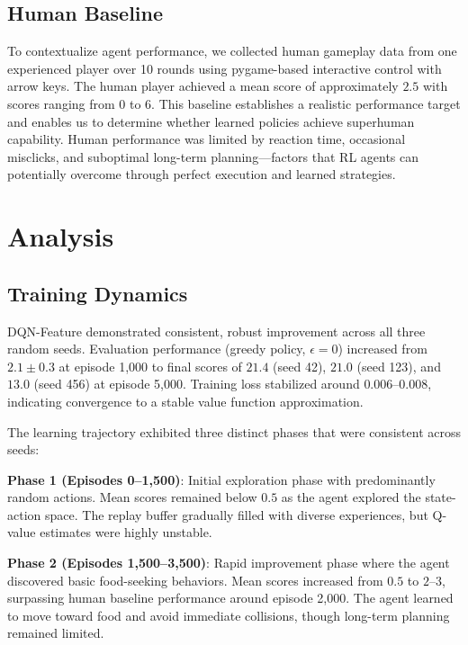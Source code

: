 \documentclass[10pt,a4paper,twocolumn]{article}
\begin{document}
\subsection{Human Baseline}

To contextualize agent performance, we collected human gameplay data from one experienced player over 10 rounds using pygame-based interactive control with arrow keys. The human player achieved a mean score of approximately $2.5$ with scores ranging from 0 to 6. This baseline establishes a realistic performance target and enables us to determine whether learned policies achieve superhuman capability. Human performance was limited by reaction time, occasional misclicks, and suboptimal long-term planning---factors that RL agents can potentially overcome through perfect execution and learned strategies.

\section{Analysis}

\subsection{Training Dynamics}

DQN-Feature demonstrated consistent, robust improvement across all three random seeds. Evaluation performance (greedy policy, $\epsilon = 0$) increased from $2.1 \pm 0.3$ at episode 1,000 to final scores of $21.4$ (seed 42), $21.0$ (seed 123), and $13.0$ (seed 456) at episode 5,000. Training loss stabilized around $0.006$--$0.008$, indicating convergence to a stable value function approximation.

The learning trajectory exhibited three distinct phases that were consistent across seeds:

\textbf{Phase 1 (Episodes 0--1,500)}: Initial exploration phase with predominantly random actions. Mean scores remained below $0.5$ as the agent explored the state-action space. The replay buffer gradually filled with diverse experiences, but Q-value estimates were highly unstable.

\textbf{Phase 2 (Episodes 1,500--3,500)}: Rapid improvement phase where the agent discovered basic food-seeking behaviors. Mean scores increased from $0.5$ to $2$--$3$, surpassing human baseline performance around episode 2,000. The agent learned to move toward food and avoid immediate collisions, though long-term planning remained limited.
\end{document}
